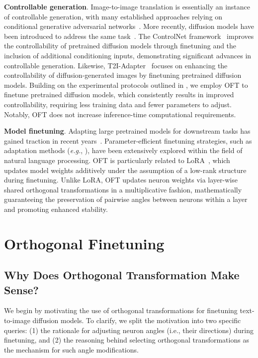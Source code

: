 \textbf{Controllable generation}. Image-to-image translation is essentially an instance of controllable generation, with many established approaches relying on conditional generative adversarial networks~\cite{isola2017image,zhu2017toward,wang2018high,park2019semantic,choi2018stargan}. More recently, diffusion models have been introduced to address the same task~\cite{saharia2022palette,voynov2022sketch,wang2022pretraining}. The ControlNet framework~\cite{zhang2023adding} improves the controllability of pretrained diffusion models through finetuning and the inclusion of additional conditioning inputs, demonstrating significant advances in controllable generation. Likewise, T2I-Adapter~\cite{mou2023t2i} focuses on enhancing the controllability of diffusion-generated images by finetuning pretrained diffusion models. Building on the experimental protocols outlined in \cite{zhang2023adding,mou2023t2i}, we employ OFT to finetune pretrained diffusion models, which consistently results in improved controllability, requiring less training data and fewer parameters to adjust. Notably, OFT does not increase inference-time computational requirements.

\textbf{Model finetuning}. Adapting large pretrained models for downstream tasks has gained traction in recent years~\cite{devlin2018bert,brown2020language,he2022masked}. Parameter-efficient finetuning strategies, such as adaptation methods (\emph{e.g.}, \cite{hulora2022,houlsby2019parameter,pfeiffer2020adapterfusion}), have been extensively explored within the field of natural language processing. OFT is particularly related to LoRA~\cite{hulora2022}, which updates model weights additively under the assumption of a low-rank structure during finetuning. Unlike LoRA, OFT updates neuron weights via layer-wise shared orthogonal transformations in a multiplicative fashion, mathematically guaranteeing the preservation of pairwise angles between neurons within a layer and promoting enhanced stability.

\section{Orthogonal Finetuning}

\subsection{Why Does Orthogonal Transformation Make Sense?}

We begin by motivating the use of orthogonal transformations for finetuning text-to-image diffusion models. To clarify, we split the motivation into two specific queries: (1) the rationale for adjusting neuron angles (i.e., their directions) during finetuning, and (2) the reasoning behind selecting orthogonal transformations as the mechanism for such angle modifications.


